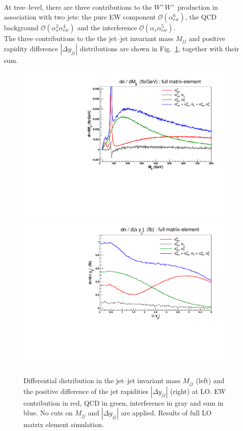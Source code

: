 At tree--level, there are three contributions to the $W^+W^+$ production in association with two jets: the pure EW component $\mathcal{O}(\alpha_{ew}^6)$, the QCD background $\mathcal{O}(\alpha_s^2\alpha_{ew}^4)$ and the interference $\mathcal{O}(\alpha_s\alpha_{ew}^5)$.\\
The three contributions to the the jet--jet invariant mass $M_{jj}$ and positive rapidity difference $|\Delta y_{jj}|$ distributions are shown in Fig.~\ref{fig:mjjdyjj_1d}, together with their sum.
\begin{figure}[hbt]
\centering
\includegraphics[scale=0.395]{figures/scanfigures/mjj_full.pdf}
\includegraphics[scale=0.395]{figures/scanfigures/dyjj_full.pdf}
\caption{Differential distribution in the jet--jet invariant mass $M_{jj}$ (left) and the positive difference of the jet rapidities $|\Delta y_{jj}|$ (right) at LO. EW contribution in red, QCD in green, interference in gray and sum in blue. No cuts on $M_{jj}$ and $|\Delta y_{jj}|$ are applied. Results of full LO matrix element simulation.}
\label{fig:mjjdyjj_1d}
\end{figure}
